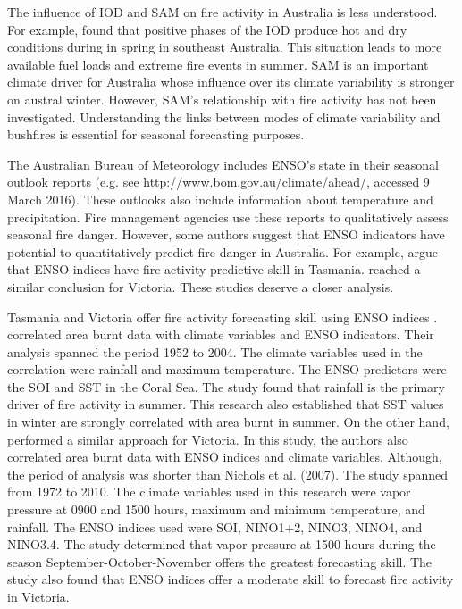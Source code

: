 The influence of IOD and SAM on fire activity in Australia is less
understood. For example, \citet{Cai2009} found that positive phases
of the IOD produce hot and dry conditions during in spring in southeast
Australia. This situation leads to more available fuel loads and extreme
fire events in summer. SAM is an important climate driver
for Australia whose influence over its climate variability is stronger on austral winter. 
However, SAM's relationship with fire activity has not been investigated.
Understanding the links between modes of climate variability and bushfires
is essential for seasonal forecasting purposes. 

The Australian Bureau of Meteorology includes ENSO's state in their
seasonal outlook reports (e.g. see http://www.bom.gov.au/climate/ahead/,
accessed 9 March 2016). These outlooks also include information about
temperature and precipitation. Fire management agencies use these
reports to qualitatively assess seasonal fire danger. However, some
authors suggest that ENSO indicators have potential to quantitatively
predict fire danger in Australia. For example, \citet{Nicholls2007}
argue that ENSO indices have fire activity predictive skill in Tasmania. \citet{Harris2013}
reached a similar conclusion for Victoria. These studies deserve a
closer analysis.

Tasmania and Victoria offer fire activity forecasting skill using
ENSO indices \citep{Nicholls2007,Harris2013}. \citet{Nicholls2007}
correlated area burnt data with climate variables and ENSO indicators.
Their analysis spanned the period 1952 to 2004. The climate variables
used in the correlation were rainfall and maximum temperature. The
ENSO predictors were the SOI and SST in the Coral Sea. The study found
that rainfall is the primary driver of fire activity in summer. This
research also established that SST values in winter are strongly correlated
with area burnt in summer. On the other hand, \citet{Harris2013}
performed a similar approach for Victoria. In this study, the authors
also correlated area burnt data with ENSO indices and climate variables.
Although, the period of analysis was shorter than Nichols et al. (2007).
The study spanned from 1972 to 2010. The climate variables used in
this research were vapor pressure at 0900 and 1500 hours, maximum
and minimum temperature, and rainfall. The ENSO indices used were
SOI, NINO1+2, NINO3, NINO4, and NINO3.4. The study determined that
vapor pressure at 1500 hours during the season September-October-November
offers the greatest forecasting skill. The study also found that ENSO
indices offer a moderate skill to forecast fire activity in Victoria.

